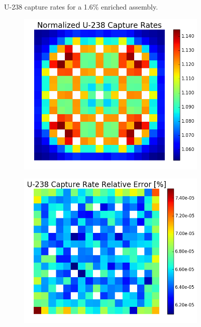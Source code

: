 \begin{figure}[h!]
\begin{subfigure}{0.5\textwidth}
  \caption{}
  \label{fig:chap7-capt-rate-rel-err-1.6-assm}
\end{subfigure}%
\caption[U-238 capture rates for a 1.6\% enriched assembly]{U-238 capture rates for a 1.6\% enriched assembly.}
\label{fig:chap7-capt-rates-1.6-assm}
\end{figure}

\begin{figure}[h!]
\centering
\begin{subfigure}{0.5\textwidth}
  \centering
  \includegraphics[width=\linewidth]{figures/benchmarks/capture-rates/capt-mean-fuel-31}
  \caption{}
  \label{fig:chap7-capt-rate-mean-3.1-assm}
\end{subfigure}%
\begin{subfigure}{0.5\textwidth}
  \centering
  \includegraphics[width=\linewidth]{figures/benchmarks/capture-rates/capt-rel-err-fuel-31}

\end{subfigure}
\end{figure}

